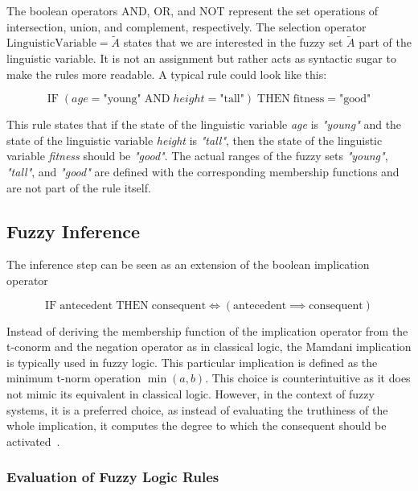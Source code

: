 The boolean operators AND, OR, and NOT represent the set operations of intersection, union, and complement, respectively. The selection operator $\text{LinguisticVariable} = \tilde{A}$ states that we are interested in the fuzzy set $\tilde{A}$ part of the linguistic variable. It is not an assignment but rather acts as syntactic sugar to make the rules more readable. A typical rule could look like this:

\begin{equation*}
      \text{IF} \;( age = \text{"young"} \; \text{AND} \; height = \text{"tall"} ) \; \text{THEN} \; \text{fitness} = \text{"good"}
\end{equation*}

This rule states that if the state of the linguistic variable \emph{age} is \emph{"young"} and the state of the linguistic variable \emph{height} is \emph{"tall"}, then the state of the linguistic variable \emph{fitness} should be \emph{"good"}. The actual ranges of the fuzzy sets \emph{"young"}, \emph{"tall"}, and \emph{"good"} are defined with the corresponding membership functions and are not part of the rule itself.

\subsection{Fuzzy Inference}

The inference step can be seen as an extension of the boolean implication operator

\begin{equation*}
      \text{IF} \; \text{antecedent} \; \text{THEN} \; \text{consequent} \iff (\text{antecedent} \implies \text{consequent})
\end{equation*}

Instead of deriving the membership function of the implication operator from the t-conorm and the negation operator as in classical logic, the Mamdani implication is typically used in fuzzy logic. This particular implication is defined as the minimum t-norm operation $\min(a,b)$. This choice is counterintuitive as it does not mimic its equivalent in classical logic. However, in the context of fuzzy systems, it is a preferred choice, as instead of evaluating the truthiness of the whole implication, it computes the degree to which the consequent should be activated~\cite{BouchonMeunier1995}.

\subsubsection{Evaluation of Fuzzy Logic Rules}

